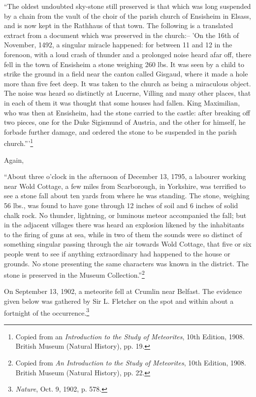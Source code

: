 \documentclass[a4paper, 12pt, oneside]{article}
\begin{document}
``The oldest undoubted sky-stone still preserved is that which was long suspended by a chain from the vault of the choir of the parish church of Ensisheim in Elsass, and is now kept in the Rathhaus of that town. The following is a translated extract from a document which was preserved in the church:-- 'On the 16th of November, 1492, a singular miracle happened: for between 11 and 12 in the forenoon, with a loud crash of thunder and a prolonged noise heard afar off, there fell in the town of Ensisheim a stone weighing 260 lbs. It was seen by a child to strike the ground in a field near the canton called Gisgaud, where it made a hole more than five feet deep. It was taken to the church as being a miraculous object. The noise was heard so distinctly at Lucerne, Villing and many other places, that in each of them it was thought that some houses had fallen. King Maximilian, who was then at Ensisheim, had the stone carried to the castle: after breaking off two pieces, one for the Duke Sigismund of Austria, and the other for himself, he forbade further damage, and ordered the stone to be suspended in the parish church.'''\footnote{Copied from an \emph{Introduction to the Study of Meteorites}, 10th Edition, 1908. British Museum (Natural History), pp. 19.}

Again,

``About three o'clock in the afternoon of December 13, 1795, a labourer working near Wold Cottage, a few miles from Scarborough, in Yorkshire, was terrified to see a stone fall about ten yards from where he was standing. The stone, weighing 56 lbs., was found to have gone through 12 inches of soil and 6 inches of solid chalk rock. No thunder, lightning, or luminous meteor accompanied the fall; but in the adjacent villages there was heard an explosion likened by the inhabitants to the firing of guns at sea, while in two of them the sounds were so distinct of something singular passing through the air towards Wold Cottage, that five or six people went to see if anything extraordinary had happened to the house or grounds. No stone presenting the same characters was known in the district. The stone is preserved in the Museum Collection.''\footnote{Copied from \emph{An Introduction to the Study of Meteorites}, 10th Edition, 1908. British Museum (Natural History), pp. 22.}

On September 13, 1902, a meteorite fell at Crumlin near Belfast. The evidence given below was gathered by Sir L. Fletcher on the spot and within about a fortnight of the occurrence.\footnote{\emph{Nature}, Oct. 9, 1902, p. 578.}
\end{document}
